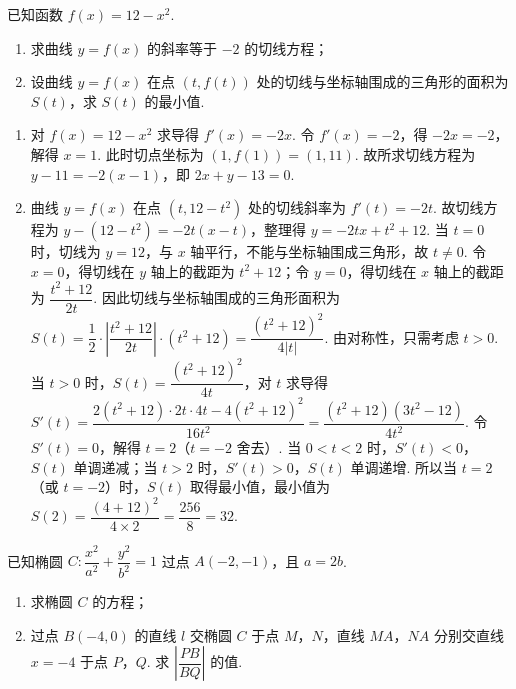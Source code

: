 \begin{problem}
已知函数 \(f(x)=12-x^2\).

\begin{enumerate}
    \item 求曲线 \(y=f(x)\) 的斜率等于 \(-2\) 的切线方程；
    \item 设曲线 \(y=f(x)\) 在点 \((t,f(t))\) 处的切线与坐标轴围成的三角形的面积为 \(S(t)\)，求 \(S(t)\) 的最小值.
\end{enumerate}
\end{problem}

\begin{solution}
\begin{enumerate}
    \item 对 \(f(x)=12-x^2\) 求导得 \(f'(x)=-2x\). 令 \(f'(x)=-2\)，得 \(-2x=-2\)，解得 \(x=1\). 此时切点坐标为 \((1,f(1))=(1,11)\). 故所求切线方程为 \(y-11=-2(x-1)\)，即 \(2x+y-13=0\).
    \item 曲线 \(y=f(x)\) 在点 \((t,12-t^2)\) 处的切线斜率为 \(f'(t)=-2t\). 故切线方程为 \(y-(12-t^2)=-2t(x-t)\)，整理得 \(y=-2tx+t^2+12\). 当 \(t=0\) 时，切线为 \(y=12\)，与 \(x\) 轴平行，不能与坐标轴围成三角形，故 \(t\neq0\). 令 \(x=0\)，得切线在 \(y\) 轴上的截距为 \(t^2+12\)；令 \(y=0\)，得切线在 \(x\) 轴上的截距为 \(\dfrac{t^2+12}{2t}\). 因此切线与坐标轴围成的三角形面积为 \(S(t)=\dfrac12\cdot\left|\dfrac{t^2+12}{2t}\right|\cdot(t^2+12)=\dfrac{(t^2+12)^2}{4|t|}\). 由对称性，只需考虑 \(t>0\). 当 \(t>0\) 时，\(S(t)=\dfrac{(t^2+12)^2}{4t}\)，对 \(t\) 求导得 \(S'(t)=\dfrac{2(t^2+12)\cdot2t\cdot4t-4(t^2+12)^2}{16t^2}=\dfrac{(t^2+12)(3t^2-12)}{4t^2}\). 令 \(S'(t)=0\)，解得 \(t=2\)（\(t=-2\) 舍去）. 当 \(0<t<2\) 时，\(S'(t)<0\)，\(S(t)\) 单调递减；当 \(t>2\) 时，\(S'(t)>0\)，\(S(t)\) 单调递增. 所以当 \(t=2\)（或 \(t=-2\)）时，\(S(t)\) 取得最小值，最小值为 \(S(2)=\dfrac{(4+12)^2}{4\times2}=\dfrac{256}{8}=32\).
\end{enumerate}
\end{solution}

\begin{problem}
已知椭圆 \(C:\dfrac{x^2}{a^2}+\dfrac{y^2}{b^2}=1\) 过点 \(A(-2,-1)\)，且 \(a=2b\).

\begin{enumerate}
    \item 求椭圆 \(C\) 的方程；
    \item 过点 \(B(-4,0)\) 的直线 \(l\) 交椭圆 \(C\) 于点 \(M\)，\(N\)，直线 \(MA\)，\(NA\) 分别交直线 \(x=-4\) 于点 \(P\)，\(Q\). 求 \(\left|\dfrac{PB}{BQ}\right|\) 的值.
\end{enumerate}
\end{problem}


